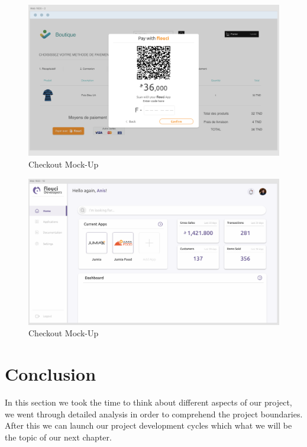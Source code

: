 \begin{spacing}{1.2}
\begin{figure}[H]\centering
\includegraphics[scale=0.4]{Checkout_screen}
\caption{Checkout Mock-Up}
\label{checkoutScreen}
\end{figure}

\begin{figure}[H]\centering
\includegraphics[scale=0.4]{web_screen}
\caption{Checkout Mock-Up}
\label{developersPlatform}
\end{figure}

\section*{Conclusion}
In this section we took the time to think about different aspects of our project, we went through detailed analysis in order to comprehend the project boundaries. After this we can launch our project development cycles which what we will be the topic of our next chapter.
\end{spacing}
